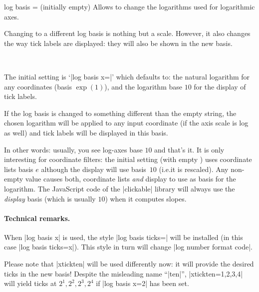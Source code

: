 \begin{pgfplotsxykey}{log basis \x= (initially empty)}
    Allows to change the logarithms used for logarithmic axes.

    Changing to a different log basis is nothing but a scale. However, it also
    changes the way tick labels are displayed: they will also be shown in the
    new basis.
\begin{codeexample}[]
~
\end{codeexample}

    The initial setting is `|log basis x=|' which defaults to: the natural
    logarithm for any coordinates (basis $\exp(1)$), and the logarithm base
    $10$ for the display of tick labels.

    If the log basis is changed to something different than the empty string,
    the chosen logarithm will be applied to any input coordinate (if the axis
    scale is log as well) and tick labels will be displayed in this basis.

    In other words: usually, you see log-axes base $10$ and that's it. It is
    only interesting for coordinate filters: the initial setting (with empty
    ) uses coordinate lists basis $e$ although the display will
    use basis~$10$ (i.e.\@ it is rescaled). Any non-empty value 
    causes both, coordinate lists \emph{and} display to use  as
    basis for the logarithm. The JavaScript code of the |clickable| library
    will always use the \emph{display} basis (which is usually $10$) when it
    computes slopes.


    \paragraph{Technical remarks.}

    When |log basis x| is used, the style |log basis ticks=|
    will be installed (in this case |log basis ticks=x|). This style in turn
    will change |log number format code|.

    Please note that |xtickten| will be used differently now: it will provide
    the desired ticks in the new basis! Despite the misleading name ``|ten|'',
    |xtickten={1,2,3,4}| will yield ticks at $2^1,2^2,2^3,2^4$ if
    |log basis x=2| has been set.
\end{pgfplotsxykey}

